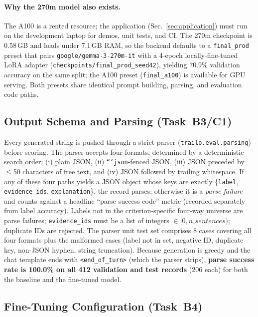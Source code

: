 \documentclass[conference]{IEEEtran}
\newcommand{\code}[1]{\texttt{\small #1}}
\newcommand{\smallname}{\texttt{google/gemma-3-270m-it}}
\begin{document}
\paragraph*{Why the 270m model also exists.}
The A100 is a rented resource; the application
(Sec.~\ref{sec:application}) must run on the development
laptop for demos, unit tests, and CI. The 270m checkpoint is
0.58\,GB and loads under 7.1\,GB RAM, so the backend defaults
to a \code{final\_prod} preset that pairs \smallname{} with a
4-epoch locally-fine-tuned LoRA adapter
(\code{checkpoints/final\_prod\_seed42}), yielding 70.9\%
validation accuracy on the same split; the A100 preset
(\code{final\_a100}) is available for GPU serving. Both presets share
identical prompt building, parsing, and evaluation code paths.

\subsection{Output Schema and Parsing (Task~B3/C1)}
\label{sec:schema}

Every generated string is pushed through a strict parser
(\code{trailo.eval.parsing}) before scoring. The parser accepts four
formats, determined by a deterministic search order:
(i) plain JSON, (ii) \code{```json}-fenced JSON,
(iii) JSON preceded by $\leq$50 characters of free text, and
(iv) JSON followed by trailing whitespace. If any of these four
paths yields a JSON object whose keys are exactly
\{\code{label}, \code{evidence\_ids}, \code{explanation}\},
the record parses; otherwise it is a \emph{parse failure} and
counts against a headline ``parse success code'' metric
(recorded separately from label accuracy). Labels not in the
criterion-specific four-way universe are parse failures;
\code{evidence\_ids} must be a list of integers
$\in[0, n\_sentences)$; duplicate IDs are rejected. The parser
unit test set comprises 8 cases
covering all four formats plus the malformed cases
(label not in set, negative ID, duplicate key, non-JSON hyphen,
string truncation). Because generation is greedy and the chat
template ends with \code{<end\_of\_turn>} (which the parser
strips), \textbf{parse success rate is 100.0\% on all 412
validation and test records} (206 each) for both the baseline
and the fine-tuned model.

\subsection{Fine-Tuning Configuration (Task~B4)}
\label{sec:train}
\end{document}
